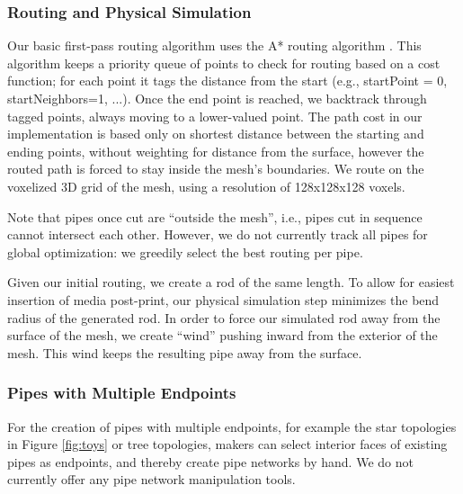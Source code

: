 \subsubsection{Routing and Physical Simulation}

Our basic first-pass routing algorithm uses the A* routing algorithm \cite{Hart-Astar}.  This algorithm keeps a priority queue of points to check for routing based on a cost function; for each point it tags the distance from the start (e.g., startPoint = 0, startNeighbors=1, ...).  Once the end point is reached, we backtrack through tagged points, always moving to a lower-valued point.  The path cost in our implementation is based only on shortest distance between the starting and ending points, without weighting for distance from the surface, however the routed path is forced to stay inside the mesh's boundaries.  We route on the voxelized 3D grid of the mesh, using a resolution of 128x128x128 voxels. 

Note that pipes once cut are ``outside the mesh'', i.e., pipes cut in sequence cannot intersect each other.  However, we do not currently track all pipes for global optimization: we greedily select the best routing per pipe.

Given our initial routing, we create a rod of the same length.  To allow for easiest insertion of media post-print, our physical simulation step minimizes the bend radius of the generated rod.  In order to force our simulated rod away from the surface of the mesh, we create ``wind'' pushing inward from the exterior of the mesh.  This wind keeps the resulting pipe away from the surface.  

\subsubsection{Pipes with Multiple Endpoints}
For the creation of pipes with multiple endpoints, for example the star topologies in Figure \ref{fig:toys} or tree topologies, makers can select interior faces of existing pipes as endpoints, and thereby create pipe networks by hand.  We do not currently offer any pipe network manipulation tools.


